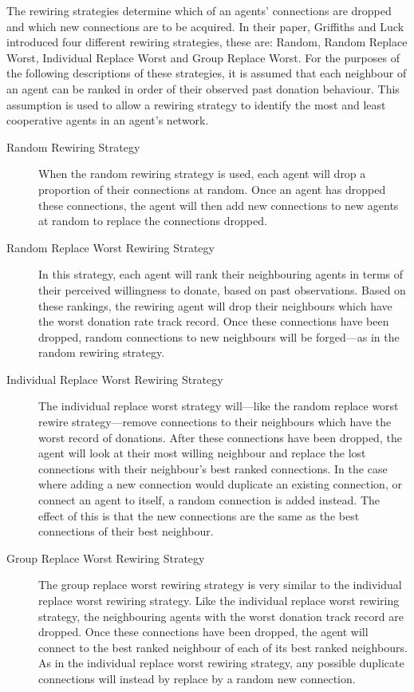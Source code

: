 The rewiring strategies determine which of an agents' connections are dropped and which new connections are to be acquired.
In their paper, Griffiths and Luck introduced four different rewiring strategies,
these are: Random, Random Replace Worst, Individual Replace Worst and Group Replace Worst.
For the purposes of the following descriptions of these strategies,
it is assumed that each neighbour of an agent can be ranked in order of their observed past donation behaviour.
This assumption is used to allow a rewiring strategy to identify the most and least cooperative agents in an agent's network.

\begin{description}
\item[Random Rewiring Strategy]
When the random rewiring strategy is used,
each agent will drop a proportion of their connections at random.
Once an agent has dropped these connections, the agent will then add new
connections to new agents at random to replace the connections dropped.

\item[Random Replace Worst Rewiring Strategy]
In this strategy, each agent will rank their neighbouring agents in terms
of their perceived willingness to donate, based on past observations.
Based on these rankings, the rewiring agent will drop their neighbours
which have the worst donation rate track record. Once these connections have
been dropped, random connections to new neighbours will be forged---as in
the random rewiring strategy.

\item[Individual Replace Worst Rewiring Strategy]
The individual replace worst strategy will---like the random replace
worst rewire strategy---remove connections to their neighbours which have
the worst record of donations. After these connections have been dropped,
the agent will look at their most willing neighbour and replace the lost
connections with their neighbour's best ranked connections. In the case where
adding a new connection would duplicate an existing connection, or connect an
agent to itself, a random connection is added instead. The effect of this is
that the new connections are the same as the best connections of their best
neighbour.

\item[Group Replace Worst Rewiring Strategy]
The group replace worst rewiring strategy is very similar to the individual
replace worst rewiring strategy. Like the individual replace worst rewiring
strategy, the neighbouring agents with the worst donation track record are
dropped. Once these connections have been dropped, the agent will connect
to the best ranked neighbour of each of its best ranked neighbours. As in the
individual replace worst rewiring strategy, any possible duplicate connections
will instead by replace by a random new connection.

\end{description}

